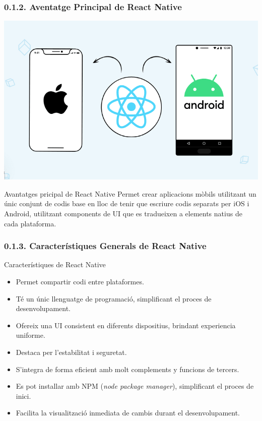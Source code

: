 \documentclass[12pt]{beamer}
\begin{document}
	\subsubsection{0.1.2. Aventatge Principal de React Native}
	\begin{frame}
		\centering\includegraphics[scale=0.3]{ReactfoiOSandAndroid.png}
		\begin{block}{Avantatges pricipal de React Native}
			Permet crear aplicacions mòbils utilitzant un únic conjunt de codis base en lloc de tenir que escriure codis separats per iOS i Android, utilitzant components de UI que es tradueixen a elements natius de cada plataforma.
		\end{block}
	\end{frame}
	\subsubsection{0.1.3. Característiques Generals de React Native}
	\begin{frame}
		\begin{block}{Característiques de React Native}
			\begin{itemize}
				\item Permet compartir codi entre plataformes.
				\item Té un únic llenguatge de programació, simplificant el proces de desenvolupament.
				\item Ofereix una UI consistent en diferents dispositius, brindant experiencia uniforme.
				\item Destaca per l'estabilitat i seguretat.
				\item S'integra de forma eficient amb molt complements y funcions de tercers.
				\item Es pot installar amb NPM (\textit{node package manager}), simplificant el proces de inici.
				\item Facilita la visualització inmediata de cambis durant el desenvolupament.
			\end{itemize}
		\end{block}
	\end{frame}
\end{document}

